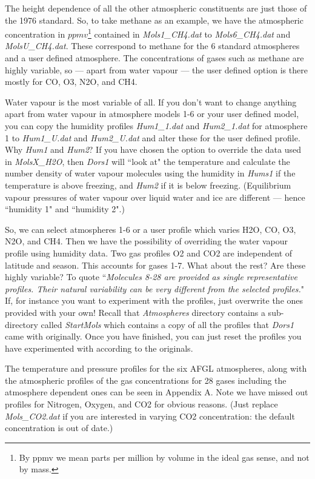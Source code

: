 \documentclass[12pt]{article}
\begin{document}
The height
 dependence of all the other atmospheric constituents are just those of the 1976 standard.
 So, to take methane as an example, we have the atmospheric concentration in $ppmv$\footnote[1]
{By ppmv we mean
parts per million by volume in the ideal gas sense, and not by mass.} contained
in {\it Mols1\_CH4.dat} to {\it Mols6\_CH4.dat} and {\it MolsU\_CH4.dat}. These correspond to
methane for the 6 standard atmospheres and a user defined atmosphere.
The concentrations of gases such as methane are highly variable, so --- apart from water vapour --- the user defined option
is there mostly for CO, O3, N2O, and CH4. 

Water vapour is the most variable of all. 
If you don't want to change anything apart from water vapour in atmosphere models 1-6 or your
user defined model, 
you can copy the humidity profiles {\it Hum1\_1.dat} and {\it Hum2\_1.dat} for atmosphere 1
 to {\it Hum1\_U.dat} and {\it Hum2\_U.dat} and alter these for the user defined profile.
 Why {\it Hum1} and {\it Hum2}? If you have chosen
the option to override the data used in {\it MolsX\_H2O}, then {\it Dors1} will ``look at" the temperature
and calculate the number density of water vapour molecules using the humidity in {\it Hums1}
 if the temperature is above freezing, and {\it Hum2} if it is below freezing. (Equilibrium vapour pressures
of water vapour over liquid water and ice are different --- hence ``humidity 1" and ``humidity 2".)

So, we can select atmospheres 1-6 or a user profile which varies H2O, CO, O3, N2O, and CH4. 
Then we have the possibility of overriding the water vapour
profile using humidity data.  Two gas profiles O2 and CO2 are independent of latitude and season.
This accounts for gases 1-7. What about the rest? Are these highly variable?
 To quote \cite{ConstProfs:Mybib} ``{\it Molecules 8-28 are provided
as single representative profiles. Their natural variability can be very different from the selected 
profiles.}" If, for instance you want to experiment with the profiles, just overwrite the ones provided
with your own! Recall that {\it Atmospheres} directory contains a sub-directory called {\it StartMols} which  contains
a copy of all the profiles that {\it Dors1} came with originally. Once you have finished, you can just reset 
 the profiles you have experimented with according to the originals. 

The temperature and pressure profiles
for the six AFGL atmospheres, along with the atmospheric profiles of the gas concentrations for 28 gases
including the atmosphere dependent ones can be seen in Appendix A. Note we have missed out profiles
for Nitrogen, Oxygen, and CO2 for obvious reasons. (Just replace {\it Mols\_CO2.dat} if you are interested in
varying CO2 concentration: the default concentration is out of date.)
\end{document}
